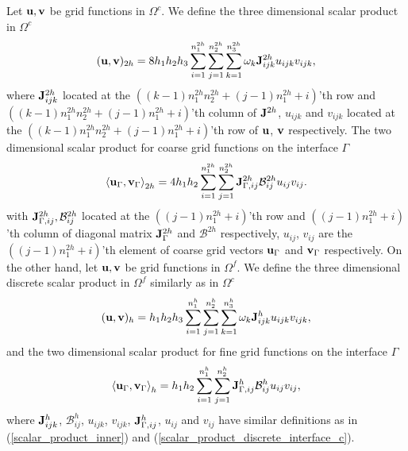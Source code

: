 Let ${\bf u}, {\bf v}$ be grid functions in $\Omega^c$. We define the three dimensional scalar product in $\Omega^c$
\begin{equation}\label{scalar_product_inner}
({\bf u}, {\bf v})_{2h} = 8h_1h_2h_3\sum_{i=1}^{n_1^{2h}}\sum_{j=1}^{n_2^{2h}}\sum_{k=1}^{n_3^{2h}}\omega_k{\bf J}_{ijk}^{2h}u_{ijk}v_{ijk},
\end{equation}
where ${\bf J}^{2h}_{ijk}$ located at the $((k-1)n_1^{2h}n_2^{2h}+(j-1)n_1^{2h}+i)$'th row and $((k-1)n_1^{2h}n_2^{2h}+(j-1)n_1^{2h}+i)$'th column of ${\bf J}^{2h}$, $u_{ijk}$ and $v_{ijk}$ located at the $((k-1)n_1^{2h}n_2^{2h}+(j-1)n_1^{2h}+i)$'th row of ${\bf u}$, ${\bf v}$ respectively. The two dimensional scalar product for coarse grid functions on the interface $\Gamma$
\begin{equation}\label{scalar_product_discrete_interface_c}
\left<{\bf u}_{\Gamma}, {\bf v}_{\Gamma}\right>_{2h} = 4h_1h_2\sum_{i=1}^{n_1^{2h}}\sum_{j=1}^{n_2^{2h}}{\bf  J}_{\Gamma,ij}^{2h}\mathcal{B}^{2h}_{ij}u_{ij}v_{ij}.
\end{equation}
with ${\bf J}^{2h}_{\Gamma,ij}, \mathcal{B}^{2h}_{ij}$ located at the $((j-1)n_1^{2h}+i)$'th row and $((j-1)n_1^{2h}+i)$'th column of diagonal matrix ${\bf J}_{\Gamma}^{2h}$ and $\mathcal{B}^{2h}$ respectively, $u_{ij}$, $v_{ij}$ are the $((j-1)n_1^{2h}+i)$'th element of coarse grid vectors ${\bf u}_{\Gamma}$ and ${\bf v}_{\Gamma}$ respectively. On the other hand, let ${\bf u}, {\bf v}$ be grid functions in $\Omega^f$. We define the three dimensional discrete scalar product in $\Omega^f$ similarly as in $\Omega^c$
\begin{equation*}
({\bf u}, {\bf v})_{h} = h_1h_2h_3\sum_{i=1}^{n_1^{h}}\sum_{j=1}^{n_2^{h}}\sum_{k=1}^{n_3^{h}}\omega_k{\bf J}_{ijk}^{h}u_{ijk}v_{ijk},
\end{equation*}
and the two dimensional scalar product for fine grid functions on the interface $\Gamma$
\begin{equation}\label{scalar_product_discrete_interface_f}
\left<{\bf u}_{\Gamma}, {\bf v}_{\Gamma}\right>_{h} = h_1h_2\sum_{i=1}^{n_1^{h}}\sum_{j=1}^{n_2^{h}}{ \bf J}^{h}_{\Gamma,ij}\mathcal{B}^{h}_{ij}u_{ij}v_{ij},
\end{equation}
where ${\bf J}^h_{ijk}$, $\mathcal{B}^{h}_{ij}$, $u_{ijk}$, $v_{ijk}$, ${\bf J}^h_{\Gamma,ij}$, $u_{ij}$ and $v_{ij}$ have similar definitions as in (\ref{scalar_product_inner}) and (\ref{scalar_product_discrete_interface_c}).


